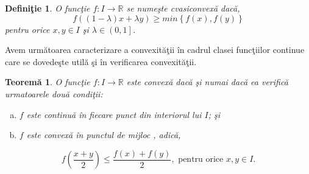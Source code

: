 \documentclass[a4paper,12pt,oneside]{report}
\newtheorem{definition}{Defini\c tie}
\newtheorem{theorem}{Teorem\u a}
\begin{document}
\begin{definition}
O func\c{t}ie \(f: I \rightarrow \mathbb{R}\) se nume\c{s}te cvasiconvex\u{a} dac\u{a},
 \begin{displaymath}
  f\left ( \left ( 1-\lambda  \right )x + \lambda y \right )\geq  min\left \{ f\left ( x \right ), f\left ( y \right ) \right \}
\end{displaymath}
pentru orice  \(x, y \in I\) \c{s}i \(\lambda  \in \left ( 0,1 \right ]\).
\end{definition}
   Avem urm\u{a}toarea caracterizare a convexit\u{a}\c{t}ii \^{i}n cadrul clasei func\c{t}iilor continue care se dovede\c{s}te util\u{a} \c{s}i \^{i}n verificarea convexit\u{a}\c{t}ii.
\begin{theorem}
O func\c{t}ie \(f : I \rightarrow \mathbb{R}\) este convex\u{a} dac\u{a} \c{s}i numai dac\u{a} ea verific\u{a} urmatoarele dou\u{a} condi\c{t}ii:
\begin{enumerate}[a)]
\item \(f\) este continu\u{a} \^{i}n fiecare punct din interiorul lui \(I\); \c{s}i
\item \(f\) este convex\u{a} \^{i}n punctul de mijloc , adic\u{a},
\end{enumerate}
\begin{displaymath}
  f\left ( \frac{x+y}{2} \right )\leq \frac{f\left ( x \right )+f\left ( y \right )}{2}, \text{ pentru orice } x, y \in I.
\end{displaymath}
\end{theorem}
\end{document}

